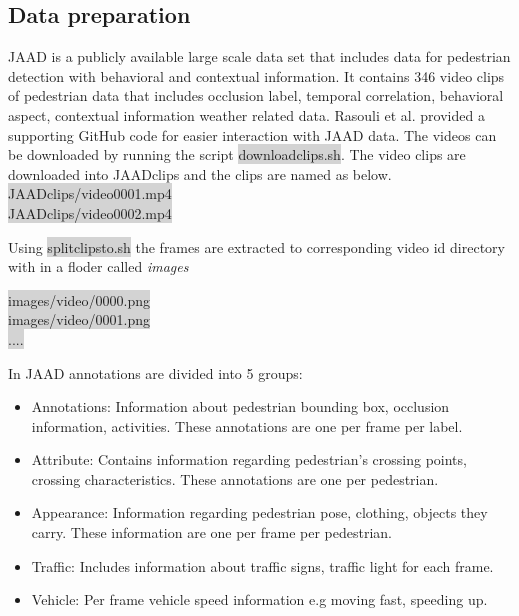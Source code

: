 \subsection{Data preparation}
JAAD \cite{rasouli2017agreeing} is a publicly available large scale data set that includes data for pedestrian detection with behavioral and contextual information. It contains 346 video clips of pedestrian data that includes occlusion label, temporal correlation, behavioral aspect, contextual information weather related data. Rasouli et al. provided a supporting GitHub code for easier interaction with JAAD data. The videos can be downloaded by running the script \colorbox{lightgray}{download\textunderscore clips.sh}. The video clips are downloaded into JAAD\textunderscore clips and the clips are named as below.\\
\colorbox{lightgray} {JAAD\textunderscore clips/video\textunderscore  0001.mp4} \\
\colorbox{lightgray} {JAAD\textunderscore clips/video\textunderscore  0002.mp4}

Using \colorbox{lightgray}{split\textunderscore clips\textunderscore to\textunderscore .sh} the frames are extracted to corresponding video id directory with in a floder called \textit{images} \\
\begin{center}
\colorbox{lightgray} {images/video/0000.png} \\
\colorbox{lightgray} {images/video/0001.png} \\
\colorbox{lightgray} {....}
\end{center}

In JAAD annotations are divided into 5 groups:
\begin{itemize}
	\item Annotations: Information about pedestrian bounding box, occlusion information, activities. These annotations are one per frame per label.
	\item Attribute: Contains information regarding pedestrian's crossing points, crossing characteristics. These annotations are one per pedestrian.
	\item Appearance: Information regarding pedestrian pose, clothing, objects they carry. These information are one per frame per pedestrian.
	\item Traffic: Includes information about traffic signs, traffic light for each frame.
	\item Vehicle: Per frame vehicle speed information e.g moving fast, speeding up.
\end{itemize}


